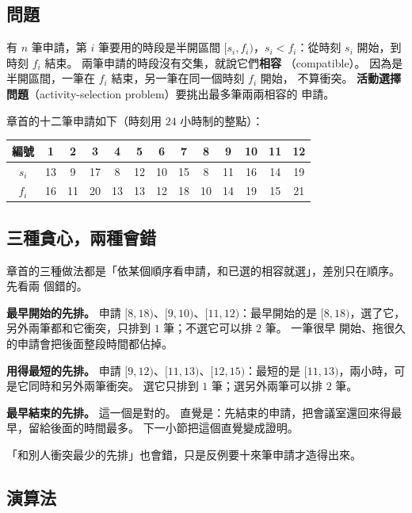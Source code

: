 \subsection{問題}

有 $n$ 筆申請，第 $i$ 筆要用的時段是半開區間 $[s_i, f_i)$，$s_i < f_i$：從時刻 $s_i$
開始，到時刻 $f_i$ 結束。 兩筆申請的時段沒有交集，就說它們\textbf{相容}
（compatible）。 因為是半開區間，一筆在 $f_i$ 結束，另一筆在同一個時刻 $f_i$ 開始，
不算衝突。 \textbf{活動選擇問題}（activity-selection problem）要挑出最多筆兩兩相容的
申請。

章首的十二筆申請如下（時刻用 $24$ 小時制的整點）：

\begin{center}
\begin{tabular}{c*{12}{c}}
\toprule
編號 & 1 & 2 & 3 & 4 & 5 & 6 & 7 & 8 & 9 & 10 & 11 & 12 \\
\midrule
$s_i$ & 13 & 9 & 17 & 8 & 12 & 10 & 15 & 8 & 11 & 16 & 14 & 19 \\
$f_i$ & 16 & 11 & 20 & 13 & 13 & 12 & 18 & 10 & 14 & 19 & 15 & 21 \\
\bottomrule
\end{tabular}
\end{center}

\subsection{三種貪心，兩種會錯}

章首的三種做法都是「依某個順序看申請，和已選的相容就選」，差別只在順序。 先看兩
個錯的。

\textbf{最早開始的先排。} 申請 $[8, 18)$、$[9, 10)$、$[11, 12)$：最早開始的是
$[8, 18)$，選了它，另外兩筆都和它衝突，只排到 $1$ 筆；不選它可以排 $2$ 筆。 一筆很早
開始、拖很久的申請會把後面整段時間都佔掉。

\textbf{用得最短的先排。} 申請 $[9, 12)$、$[11, 13)$、$[12, 15)$：最短的是
$[11, 13)$，兩小時，可是它同時和另外兩筆衝突。 選它只排到 $1$ 筆；選另外兩筆可以排
$2$ 筆。

\textbf{最早結束的先排。} 這一個是對的。 直覺是：先結束的申請，把會議室還回來得最
早，留給後面的時間最多。 下一小節把這個直覺變成證明。

「和別人衝突最少的先排」也會錯，只是反例要十來筆申請才造得出來。

\subsection{演算法}

